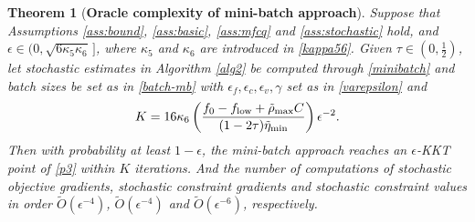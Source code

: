 \documentclass[11pt]{article}
\newtheorem{theorem}{Theorem}
\begin{document}
\begin{theorem}[{\bf Oracle complexity of mini-batch approach}]\label{thm:complexity-mb}
    Suppose that Assumptions \ref{ass:bound}, \ref{ass:basic}, \ref{ass:mfcq} and  \ref{ass:stochastic} hold, and \(\epsilon \in (0, \sqrt{6 \kappa_5 \kappa_{6}}\,]\),  where $\kappa_5$ and $\kappa_6$ are introduced in \eqref{kappa56}. Given \(\tau \in (0,\frac{1}{2})\),  let stochastic estimates in Algorithm \ref{alg2} be computed through \eqref{minibatch} and    batch sizes be set as in \eqref{batch-mb} with \(\epsilon_f, \epsilon_c, \epsilon_v, \gamma\)  set as in \eqref{varepsilon} and  
    \begin{align}\label{K-mb}
    K = 16\kappa_{6}\left(\frac{f_0-f_{\rm low}+\tilde \rho_{\rm max} C}{(1-2\tau)\tilde \eta_{\rm min}}\right)\epsilon^{-2}.
    \end{align}
    Then with probability at least \(1-\epsilon\), the mini-batch approach  reaches an $\epsilon$-KKT point of \eqref{p3} within $K$ iterations. %
    And the number of computations of stochastic objective gradients, stochastic constraint gradients and stochastic constraint values in order \( \tilde O (\epsilon^{-4} ) \), \( \tilde O (\epsilon^{-4} ) \) and \( \tilde O (\epsilon^{-6}) \), respectively.
\end{theorem}
\end{document}
